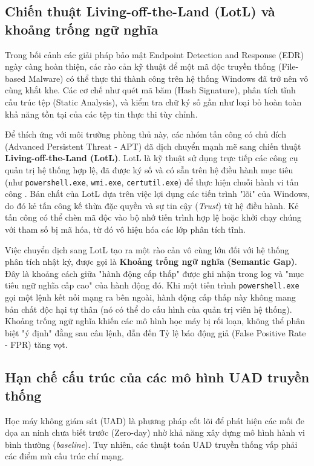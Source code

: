 \documentclass[../main.tex]{subfiles}
\begin{document}
\subsection{Chiến thuật Living-off-the-Land (LotL) và khoảng trống ngữ nghĩa}
Trong bối cảnh các giải pháp bảo mật Endpoint Detection and Response (EDR) ngày càng hoàn thiện, các rào cản kỹ thuật để một mã độc truyền thống (File-based Malware) có thể thực thi thành công trên hệ thống Windows đã trở nên vô cùng khắt khe. Các cơ chế như quét mã băm (Hash Signature), phân tích tĩnh cấu trúc tệp (Static Analysis), và kiểm tra chữ ký số gần như loại bỏ hoàn toàn khả năng tồn tại của các tệp tin thực thi tùy chỉnh.

Để thích ứng với môi trường phòng thủ này, các nhóm tấn công có chủ đích (Advanced Persistent Threat - APT) đã dịch chuyển mạnh mẽ sang chiến thuật \textbf{Living-off-the-Land (LotL)}. LotL là kỹ thuật sử dụng trực tiếp các công cụ quản trị hệ thống hợp lệ, đã được ký số và có sẵn trên hệ điều hành mục tiêu (như \texttt{powershell.exe}, \texttt{wmi.exe}, \texttt{certutil.exe}) để thực hiện chuỗi hành vi tấn công \cite{hassan2020tactical}. Bản chất của LotL dựa trên việc lợi dụng các tiến trình "lõi" của Windows, do đó kẻ tấn công kế thừa đặc quyền và sự tin cậy (\textit{Trust}) từ hệ điều hành. Kẻ tấn công có thể chèn mã độc vào bộ nhớ tiến trình hợp lệ hoặc khởi chạy chúng với tham số bị mã hóa, từ đó vô hiệu hóa các lớp phân tích tĩnh.

Việc chuyển dịch sang LotL tạo ra một rào cản vô cùng lớn đối với hệ thống phân tích nhật ký, được gọi là \textbf{Khoảng trống ngữ nghĩa (Semantic Gap)}. Đây là khoảng cách giữa "hành động cấp thấp" được ghi nhận trong log và "mục tiêu ngữ nghĩa cấp cao" của hành động đó. Khi một tiến trình \texttt{powershell.exe} gọi một lệnh kết nối mạng ra bên ngoài, hành động cấp thấp này không mang bản chất độc hại tự thân (nó có thể do cấu hình của quản trị viên hệ thống). Khoảng trống ngữ nghĩa khiến các mô hình học máy bị rối loạn, không thể phân biệt "ý định" đằng sau câu lệnh, dẫn đến Tỷ lệ báo động giả (False Positive Rate - FPR) tăng vọt.

\subsection{Hạn chế cấu trúc của các mô hình UAD truyền thống}
\label{subsection:2.1.2}

Học máy không giám sát (UAD) là phương pháp cốt lõi để phát hiện các mối đe dọa an ninh chưa biết trước (Zero-day) nhờ khả năng xây dựng mô hình hành vi bình thường (\textit{baseline}). Tuy nhiên, các thuật toán UAD truyền thống vấp phải các điểm mù cấu trúc chí mạng.
\end{document}
